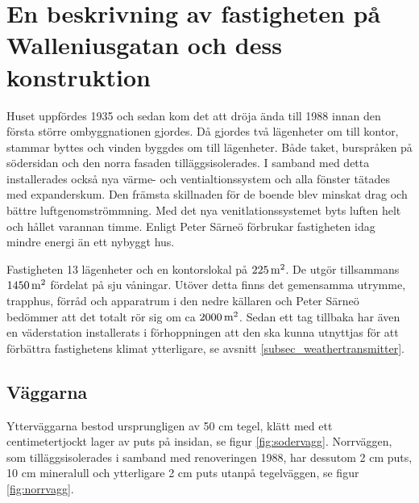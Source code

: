 \section{En beskrivning av fastigheten på Walleniusgatan och dess konstruktion}
\label{subsec:thehouse}




Huset uppfördes 1935\cite{ritningar_urspr} och sedan kom det att dröja ända till 1988 innan den första större ombyggnationen gjordes. Då gjordes två lägenheter om till kontor, stammar byttes och vinden byggdes om till lägenheter. Både taket, burspråken på södersidan och den norra fasaden tilläggsisolerades. I samband med detta installerades också nya värme- och ventialtionssystem och alla fönster tätades med expanderskum. Den främsta skillnaden för de boende blev minskat drag och bättre luftgenomströmmning.  Med det nya venitlationssystemet byts luften helt och hållet varannan timme. Enligt Peter Särneö\cite{petersarneo} förbrukar fastigheten idag mindre energi än ett nybyggt hus.

Fastigheten 13 lägenheter och en kontorslokal på $\unit[225]{m^2}$. De utgör tillsammans $\unit[1450]{m^2}$ fördelat på sju våningar. Utöver detta finns det gemensamma utrymme, trapphus, förråd och apparatrum i den nedre källaren och Peter Särneö\cite{petersarneo} bedömmer att det totalt rör sig om ca $\unit[2000]{m^2}$. Sedan ett tag tillbaka har även en väderstation installerats i förhoppningen att den ska kunna utnyttjas för att förbättra fastighetens klimat ytterligare, se avsnitt \ref{subsec_weathertransmitter}.


\subsection{Väggarna}

Ytterväggarna bestod ursprungligen av 50 cm tegel, klätt med ett centimetertjockt lager av puts på insidan, se figur \ref{fig:sodervagg}. Norrväggen, som tilläggsisolerades i samband med renoveringen 1988, har dessutom 2 cm puts, 10 cm mineralull och ytterligare 2 cm puts utanpå tegelväggen, se figur \ref{fig:norrvagg}.\cite{kandidatarbete2010}\cite{petersarneo}

